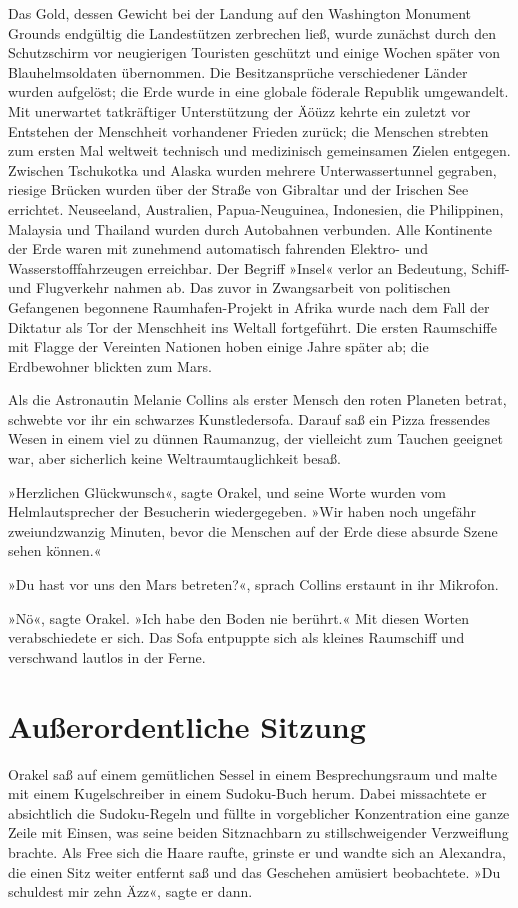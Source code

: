 Das Gold, dessen Gewicht bei der Landung auf den Washington Monument Grounds endgültig die Landestützen zerbrechen ließ, wurde zunächst durch den Schutzschirm vor neugierigen Touristen geschützt und einige Wochen später von Blauhelmsoldaten übernommen. Die Besitzansprüche verschiedener Länder wurden aufgelöst; die Erde wurde in eine globale föderale Republik umgewandelt. Mit unerwartet tatkräftiger Unterstützung der Äöüzz kehrte ein zuletzt vor Entstehen der Menschheit vorhandener Frieden zurück; die Menschen strebten zum ersten Mal weltweit technisch und medizinisch gemeinsamen Zielen entgegen. Zwischen Tschukotka und Alaska wurden mehrere Unterwassertunnel gegraben, riesige Brücken wurden über der Straße von Gibraltar und der Irischen See errichtet. Neuseeland, Australien, Papua-Neuguinea, Indonesien, die Philippinen, Malaysia und Thailand wurden durch Autobahnen verbunden. Alle Kontinente der Erde waren mit zunehmend automatisch fahrenden Elektro- und Wasserstofffahrzeugen erreichbar. Der Begriff »Insel« verlor an Bedeutung, Schiff- und Flugverkehr nahmen ab. Das zuvor in Zwangsarbeit von politischen Gefangenen begonnene Raumhafen-Projekt in Afrika wurde nach dem Fall der Diktatur als Tor der Menschheit ins Weltall fortgeführt. Die ersten Raumschiffe mit Flagge der Vereinten Nationen hoben einige Jahre später ab; die Erdbewohner blickten zum Mars.

Als die Astronautin Melanie Collins als erster Mensch den roten Planeten betrat, schwebte vor ihr ein schwarzes Kunstledersofa. Darauf saß ein Pizza fressendes Wesen in einem viel zu dünnen Raumanzug, der vielleicht zum Tauchen geeignet war, aber sicherlich keine Weltraumtauglichkeit besaß.

»Herzlichen Glückwunsch«, sagte Orakel, und seine Worte wurden vom Helmlautsprecher der Besucherin wiedergegeben. »Wir haben noch ungefähr zweiundzwanzig Minuten, bevor die Menschen auf der Erde diese absurde Szene sehen können.«

»Du hast vor uns den Mars betreten?«, sprach Collins erstaunt in ihr Mikrofon.

»Nö«, sagte Orakel. »Ich habe den Boden nie berührt.« Mit diesen Worten verabschiedete er sich. Das Sofa entpuppte sich als kleines Raumschiff und verschwand lautlos in der Ferne.


\chapter{Außerordentliche Sitzung}

Orakel saß auf einem gemütlichen Sessel in einem Besprechungsraum und malte mit einem Kugelschreiber in einem Sudoku-Buch herum. Dabei missachtete er absichtlich die Sudoku-Regeln und füllte in vorgeblicher Konzentration eine ganze Zeile mit Einsen, was seine beiden Sitznachbarn zu stillschweigender Verzweiflung brachte. Als Free sich die Haare raufte, grinste er und wandte sich an Alexandra, die einen Sitz weiter entfernt saß und das Geschehen amüsiert beobachtete. »Du schuldest mir zehn Äzz«, sagte er dann.

